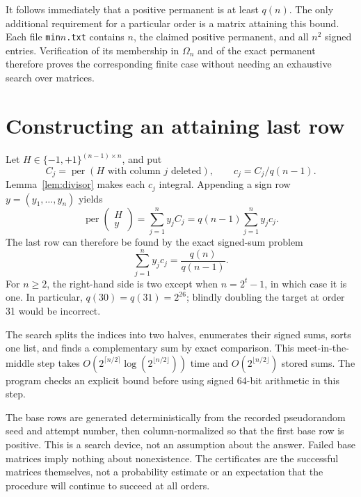 \documentclass[11pt,a4paper]{article}
\theoremstyle{remark}\newtheorem{remark}[theorem]{Remark}
\DeclareMathOperator{\per}{per}
\newcommand{\Om}{\Omega}
\begin{document}
It follows immediately that a positive permanent is at least $q(n)$. The only additional requirement for a particular order is a matrix attaining this bound. Each file \texttt{min$n$.txt} contains $n$, the claimed positive permanent, and all $n^2$ signed entries. Verification of its membership in $\Om_n$ and of the exact permanent therefore proves the corresponding finite case without needing an exhaustive search over matrices.

\begin{table}[htbp]
\centering\small

\caption{Supplied attaining matrices beyond the order-20 reference range. Matrices of orders 1--20 are also supplied and checked.}
\label{tab:minima}
\end{table}

\section{Constructing an attaining last row}
Let $H\in\{-1,+1\}^{(n-1)\times n}$, and put
\[
 C_j=\per(H\text{ with column }j\text{ deleted}),\qquad c_j=C_j/q(n-1).
\]
Lemma~\ref{lem:divisor} makes each $c_j$ integral. Appending a sign row $y=(y_1,\ldots,y_n)$ yields
\begin{equation}\label{eq:lastrow}
 \per\!\begin{pmatrix}H\\y\end{pmatrix}
 =\sum_{j=1}^n y_j C_j
 =q(n-1)\sum_{j=1}^n y_j c_j.
\end{equation}
The last row can therefore be found by the exact signed-sum problem
\begin{equation}\label{eq:signedsum}
 \sum_{j=1}^n y_j c_j=\frac{q(n)}{q(n-1)}.
\end{equation}
For $n\geq2$, the right-hand side is two except when $n=2^t-1$, in which case it is one. In particular, $q(30)=q(31)=2^{26}$; blindly doubling the target at order 31 would be incorrect.

The search splits the indices into two halves, enumerates their signed sums, sorts one list, and finds a complementary sum by exact comparison. This meet-in-the-middle step takes $O(2^{\lceil n/2\rceil}\log(2^{\lfloor n/2\rfloor}))$ time and $O(2^{\lfloor n/2\rfloor})$ stored sums. The program checks an explicit bound before using signed 64-bit arithmetic in this step.

The base rows are generated deterministically from the recorded pseudorandom seed and attempt number, then column-normalized so that the first base row is positive. This is a search device, not an assumption about the answer. Failed base matrices imply nothing about nonexistence. The certificates are the successful matrices themselves, not a probability estimate or an expectation that the procedure will continue to succeed at all orders.
\end{document}
